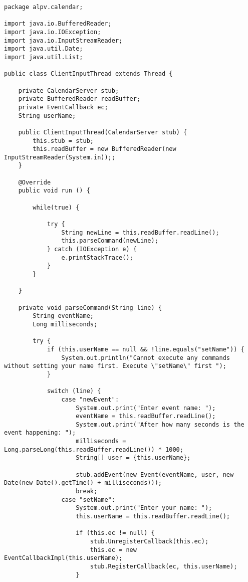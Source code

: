 \begin{lstlisting}[style=java]
package alpv.calendar;

import java.io.BufferedReader;
import java.io.IOException;
import java.io.InputStreamReader;
import java.util.Date;
import java.util.List;

public class ClientInputThread extends Thread {

    private CalendarServer stub;
    private BufferedReader readBuffer;
    private EventCallback ec;
    String userName;

    public ClientInputThread(CalendarServer stub) {
        this.stub = stub;
        this.readBuffer = new BufferedReader(new InputStreamReader(System.in));;
    }

    @Override
    public void run () {

        while(true) {

            try {
                String newLine = this.readBuffer.readLine();
                this.parseCommand(newLine);
            } catch (IOException e) {
                e.printStackTrace();
            }
        }

    }

    private void parseCommand(String line) {
        String eventName;
        Long milliseconds;

        try {
            if (this.userName == null && !line.equals("setName")) {
                System.out.println("Cannot execute any commands without setting your name first. Execute \"setName\" first ");
            }

            switch (line) {
                case "newEvent":
                    System.out.print("Enter event name: ");
                    eventName = this.readBuffer.readLine();
                    System.out.print("After how many seconds is the event happening: ");
                    milliseconds = Long.parseLong(this.readBuffer.readLine()) * 1000;
                    String[] user = {this.userName};

                    stub.addEvent(new Event(eventName, user, new Date(new Date().getTime() + milliseconds)));
                    break;
                case "setName":
                    System.out.print("Enter your name: ");
                    this.userName = this.readBuffer.readLine();

                    if (this.ec != null) {
                        stub.UnregisterCallback(this.ec);
                        this.ec = new EventCallbackImpl(this.userName);
                        stub.RegisterCallback(ec, this.userName);
                    }


\end{lstlisting}
